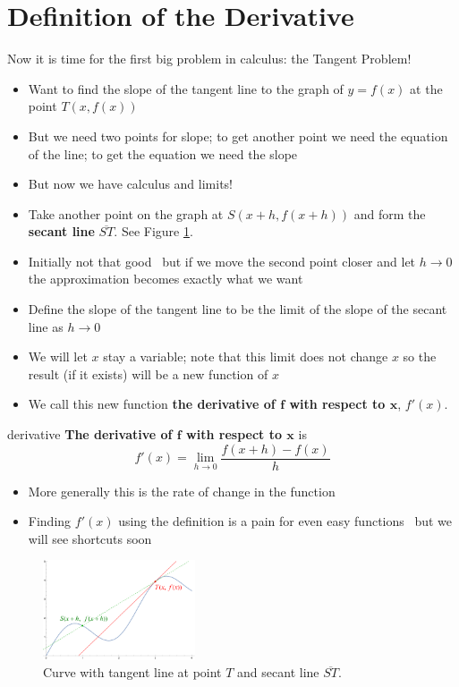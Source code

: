 \documentclass[letterpaper, 11pt, openany]{book}
\theoremstyle{mytheoremstyle}
\theoremstyle{myexamplestyle}
\begin{document}
\section{Definition of the Derivative}

Now it is time for the first big problem in calculus: the Tangent Problem!
\begin{itemize}
    \item Want to find the slope of the tangent line to the graph of \(y = f(x)\) at the point \( T(x, f(x))\)
    \item But we need two points for slope; to get another point we need the equation of the line; to get the equation we need the slope \faFrown
    \item But now we have calculus and limits! \faSmile
    \item Take another point on the graph at \(S(x+h, f(x+h))\) and form the \textbf{secant line} \(\overline{ST}\). See Figure \ref{f:tan-sec-lines}.
    \item Initially not that good \faFrown \, but if we move the second point closer and let \(h \to 0\) the approximation becomes exactly what we want \faSmile
    \item Define the slope of the tangent line to be the limit of the slope of the secant line as \(h \to 0\)
    \item We will let \(x\) stay a variable; note that this limit does not change \(x\) so the result (if it exists) will be a new function of \(x\)
    \item We call this new function \textbf{the derivative of \(\bm{f}\) with respect to \(\bm{x}\)}, \(f'(x)\).
\end{itemize}
\begin{definition}{}{derivative}
    \textbf{The derivative of \(\bm{f}\) with respect to \(\bm{x}\)} is
    \[f'(x) = \lim_{h \to 0} \frac{f(x+h) - f(x)}{h}\]
\end{definition}
\begin{itemize}
    \item More generally this is the rate of change in the function
    \item Finding \(f'(x)\) using the definition is a pain for even easy functions \faFrown \, but we will see shortcuts soon \faSmile
\end{itemize}
\begin{figure}[htbp]
    \centering
        \includegraphics[width=0.4\textwidth]{Figures/tangentline.pdf}
    \caption{Curve with tangent line at point \(T\) and secant line \(\overline{ST}\).}
    \label{f:tan-sec-lines}
\end{figure}
\end{document}
